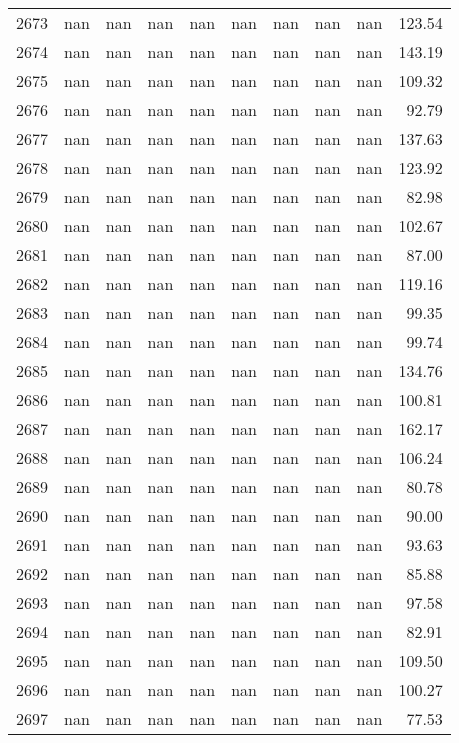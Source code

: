 \begin{tabular}{lrrrrrrrrr}
2673 & nan & nan & nan & nan & nan & nan & nan & nan & 123.54 \\
2674 & nan & nan & nan & nan & nan & nan & nan & nan & 143.19 \\
2675 & nan & nan & nan & nan & nan & nan & nan & nan & 109.32 \\
2676 & nan & nan & nan & nan & nan & nan & nan & nan & 92.79 \\
2677 & nan & nan & nan & nan & nan & nan & nan & nan & 137.63 \\
2678 & nan & nan & nan & nan & nan & nan & nan & nan & 123.92 \\
2679 & nan & nan & nan & nan & nan & nan & nan & nan & 82.98 \\
2680 & nan & nan & nan & nan & nan & nan & nan & nan & 102.67 \\
2681 & nan & nan & nan & nan & nan & nan & nan & nan & 87.00 \\
2682 & nan & nan & nan & nan & nan & nan & nan & nan & 119.16 \\
2683 & nan & nan & nan & nan & nan & nan & nan & nan & 99.35 \\
2684 & nan & nan & nan & nan & nan & nan & nan & nan & 99.74 \\
2685 & nan & nan & nan & nan & nan & nan & nan & nan & 134.76 \\
2686 & nan & nan & nan & nan & nan & nan & nan & nan & 100.81 \\
2687 & nan & nan & nan & nan & nan & nan & nan & nan & 162.17 \\
2688 & nan & nan & nan & nan & nan & nan & nan & nan & 106.24 \\
2689 & nan & nan & nan & nan & nan & nan & nan & nan & 80.78 \\
2690 & nan & nan & nan & nan & nan & nan & nan & nan & 90.00 \\
2691 & nan & nan & nan & nan & nan & nan & nan & nan & 93.63 \\
2692 & nan & nan & nan & nan & nan & nan & nan & nan & 85.88 \\
2693 & nan & nan & nan & nan & nan & nan & nan & nan & 97.58 \\
2694 & nan & nan & nan & nan & nan & nan & nan & nan & 82.91 \\
2695 & nan & nan & nan & nan & nan & nan & nan & nan & 109.50 \\
2696 & nan & nan & nan & nan & nan & nan & nan & nan & 100.27 \\
2697 & nan & nan & nan & nan & nan & nan & nan & nan & 77.53 \\

\end{tabular}
